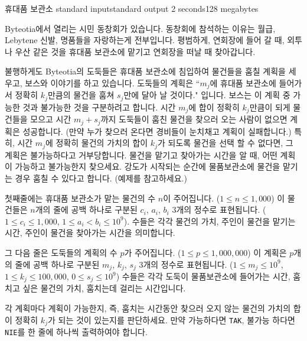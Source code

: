 \begin{problem}{휴대품 보관소}
	{standard input}{standard output}
	{2 seconds}{128 megabytes}{}
	
Byteotia에서 열리는 시민 동창회가 있습니다. 동창회에 참석하는 이유는 월급, Lebytene 신발, 명품들을 자랑하는게 전부입니다. 평범하게, 연회장에 들어 갈 때, 외투나 우산 같은 것을 휴대품 보관소에 맡기고 연회장을 떠날 때 찾아갑니다.

불행하게도 Byteotia의 도둑들은 휴대품 보관소에 침입하여 물건들을 훔칠 계획을 세우고, 보스와 이야기를 하고 있습니다. 도둑들의 계획은 ``$m_j$에 휴대품 보관소에 들어가서 정확히 $k_j$만큼의 물건을 훔쳐 $s_j$만에 달아 날 것이다." 입니다. 보스는 이 계획 중 가능한 것과 불가능한 것을 구분하려고 합니다. 시간 $m_j$에 합이 정확히 $k_j$만큼이 되게 물건들을 모으고 시간 $m_j + s_j$까지 도둑들이 훔친 물건을 찾으러 오는 사람이 없으면 계획은 성공합니다. (만약 누가 찾으러 온다면 경비들이 눈치채고 계획이 실패합니다.) 특히, 시간 $m_j$에 정확히 물건의 가치의 합이 $k_j$가 되도록 물건을 선택 할 수 없다면, 그 계획은 불가능하다고 거부당합니다. 물건을 맡기고 찾아가는 시간을 알 때, 어떤 계획이 가능하고 불가능한지 찾으세요. 강도가 시작되는 순간에 물품보관소에 물건을 맡기는 경우 훔칠 수 있다고 합니다. (예제를 참고하세요.)

	\InputFile
	


첫째줄에는 휴대품 보관소가 맡는 물건의 수 $n$이 주어집니다. ($1 \le n \le 1,000$) 이 물건들은 $n$개의 줄에 공백 하나로 구분된 $c_i$, $a_i$, $b_i$ 3개의 정수로 표현됩니다. ($1 \le c_i \le 1, 000$, $1 \le a_i < b_i \le 10^9$). 수들은 각각 물건의 가치, 주인이 물건을 맡기는 시간, 주인이 물건을 찾아가는 시간을 의미합니다.

그 다음 줄은 도둑들의 계획의 수 $p$가 주어집니다. ($1 \le p \le 1,000,000$) 이 계획은 $p$개의 줄에 공백 하나로 구분된 $m_j$, $k_j$, $s_j$ 3개의 정수로 표현됩니다. ($1 \le m_j \le 10^9$, $1 \le k_j \le 100, 000$, $0 \le s_j \le 10^9$) 수들은 각각 도둑이 물품보관소에 들어가는 시간, 훔치고 싶은 물건의 가치, 훔치는데 걸리는 시간입니다.


	
	\OutputFile

각 계획마다 계획이 가능한지, 즉, 훔치는 시간동안 찾으러 오지 않는 물건의 가치의 합이 정확히 $k_j$가 되는 것이 있는지를 판단하세요. 만약 가능하다면 \texttt{TAK}, 불가능 하다면 \texttt{NIE}를 한 줄에 하나씩 출력하여야 합니다.

	\Examples
		
	\begin{example}
	\end{example}

\end{problem}

